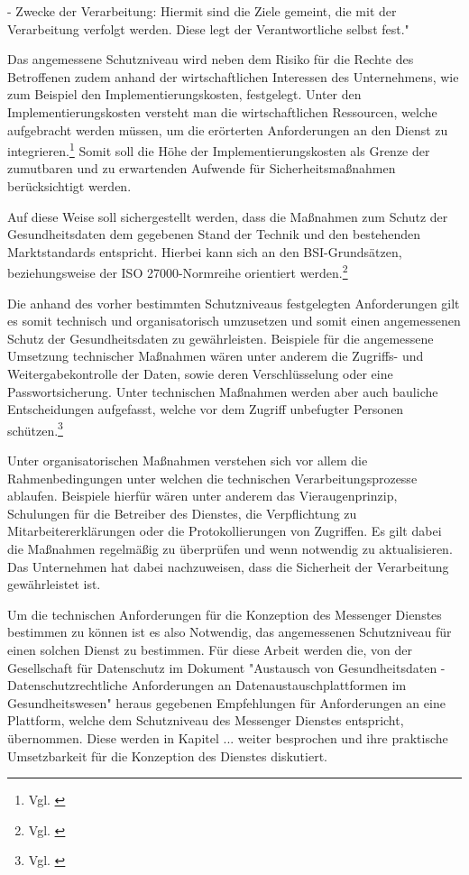 - Zwecke der Verarbeitung: Hiermit sind die Ziele gemeint, die mit der Verarbeitung verfolgt werden. Diese legt der Verantwortliche selbst fest."

Das angemessene Schutzniveau wird neben dem Risiko für die Rechte des Betroffenen zudem anhand der wirtschaftlichen Interessen des Unternehmens, wie zum Beispiel den Implementierungskosten, festgelegt. Unter den Implementierungskosten versteht man die wirtschaftlichen Ressourcen, welche aufgebracht werden müssen, um die erörterten Anforderungen an den Dienst zu integrieren.\footnote{Vgl. \cite[S. 42 f.]{OrientierungshilfezumGesundheitsdatenschutz2018}} Somit soll die Höhe der Implementierungskosten als Grenze der zumutbaren und zu erwartenden Aufwende für Sicherheitsmaßnahmen berücksichtigt werden.

Auf diese Weise soll sichergestellt werden, dass die Maßnahmen zum Schutz der Gesundheitsdaten dem gegebenen Stand der Technik und den bestehenden Marktstandards entspricht. Hierbei kann sich an den BSI-Grundsätzen, beziehungsweise der ISO 27000-Normreihe orientiert werden.\footnote{Vgl. \cite[S. 42 f.]{OrientierungshilfezumGesundheitsdatenschutz2018}}

Die anhand des vorher bestimmten Schutzniveaus festgelegten Anforderungen gilt es somit technisch und organisatorisch umzusetzen und somit einen angemessenen Schutz der Gesundheitsdaten zu gewährleisten. Beispiele für die angemessene Umsetzung technischer Maßnahmen wären unter anderem die Zugriffs- und Weitergabekontrolle der Daten, sowie deren Verschlüsselung oder eine Passwortsicherung. Unter technischen Maßnahmen werden aber auch bauliche Entscheidungen aufgefasst, welche vor dem Zugriff unbefugter Personen schützen.\footnote{Vgl. \cite[S. 41 ff.]{OrientierungshilfezumGesundheitsdatenschutz2018}}

Unter organisatorischen Maßnahmen verstehen sich vor allem die Rahmenbedingungen unter welchen die technischen Verarbeitungsprozesse ablaufen. Beispiele hierfür wären unter anderem das Vieraugenprinzip, Schulungen für die Betreiber des Dienstes, die Verpflichtung zu Mitarbeitererklärungen oder die Protokollierungen von Zugriffen. Es gilt dabei die Maßnahmen regelmäßig zu überprüfen und wenn notwendig zu aktualisieren. Das Unternehmen hat dabei nachzuweisen, dass die Sicherheit der Verarbeitung gewährleistet ist. 

Um die technischen Anforderungen für die Konzeption des Messenger Dienstes bestimmen zu können ist es also Notwendig, das angemessenen Schutzniveau für einen solchen Dienst zu bestimmen. Für diese Arbeit werden die, von der Gesellschaft für Datenschutz im Dokument "Austausch von Gesundheitsdaten -  Datenschutzrechtliche Anforderungen an Datenaustauschplattformen im Gesundheitswesen" heraus gegebenen Empfehlungen für Anforderungen an eine Plattform, welche dem Schutzniveau des Messenger Dienstes entspricht, übernommen. Diese werden in Kapitel ... weiter besprochen und ihre praktische Umsetzbarkeit für die Konzeption des Dienstes diskutiert. 


